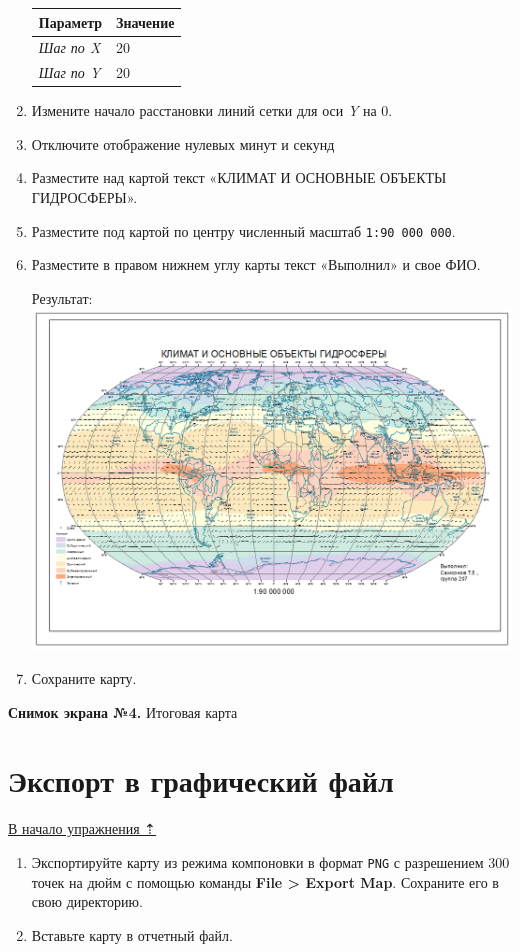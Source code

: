 \documentclass[]{book}
\theoremstyle{definition}
\theoremstyle{definition}
\theoremstyle{definition}
\theoremstyle{remark}
\begin{document}
\begin{enumerate}
  \begin{longtable}[]{@{}ll@{}}
  \toprule
  \textbf{Параметр} & \textbf{Значение}\tabularnewline
  \midrule
  \endhead
  \emph{Шаг по X} & 20\tabularnewline
  \emph{Шаг по Y} & 20\tabularnewline
  \bottomrule
  \end{longtable}
\item
  Измените начало расстановки линий сетки для оси \emph{Y} на 0.
\item
  Отключите отображение нулевых минут и секунд
\item
  Разместите над картой текст «КЛИМАТ И ОСНОВНЫЕ ОБЪЕКТЫ ГИДРОСФЕРЫ».
\item
  Разместите под картой по центру численный масштаб
  \texttt{1:90\ 000\ 000}.
\item
  Разместите в правом нижнем углу карты текст «Выполнил» и свое ФИО.

  Результат: \includegraphics{images/Ex03/image35.png}
\item
  Сохраните карту.
\end{enumerate}

\textbf{Снимок экрана №4.} Итоговая карта

\hypertarget{map-design-climates-export}{%
\section{Экспорт в графический файл}\label{map-design-climates-export}}

\protect\hyperlink{map-design-climates}{В начало упражнения ⇡}

\begin{enumerate}
\def\labelenumi{\arabic{enumi}.}
\item
  Экспортируйте карту из режима компоновки в формат \texttt{PNG} с
  разрешением 300 точек на дюйм с помощью команды \textbf{File
  \textgreater{} Export Map}. Сохраните его в свою директорию.
\item
  Вставьте карту в отчетный файл.
\end{enumerate}
\end{document}
